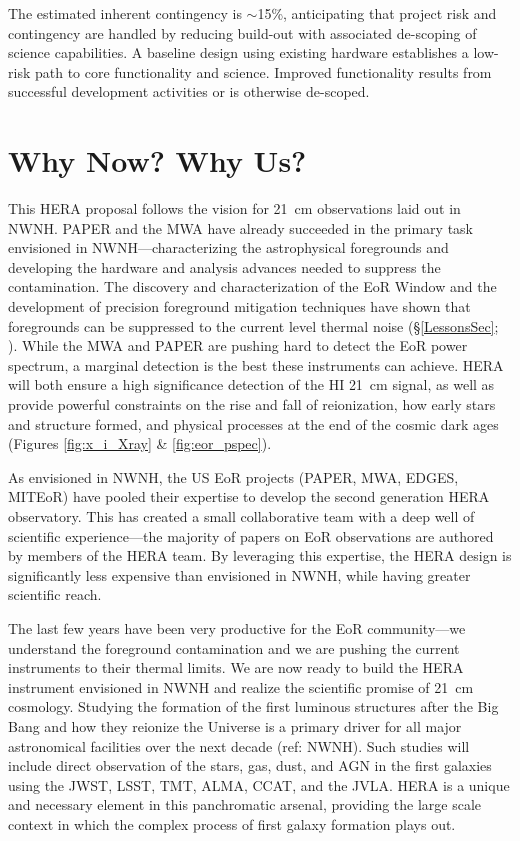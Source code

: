 \documentclass[preprint]{aastex}
\def\HI{{H{\small I }}}
\begin{document}
The estimated inherent contingency is $\sim$15\%, anticipating that project 
risk and contingency are handled by reducing
build-out with associated de-scoping of science capabilities.
A baseline design using
existing hardware establishes a low-risk path to core functionality and science.  Improved functionality
results from successful development activities or is otherwise de-scoped.


\section{Why Now? Why Us?} %

This HERA proposal follows the vision for 21~cm observations laid out in NWNH.
PAPER and the MWA have already succeeded in the primary task envisioned in
NWNH---characterizing the astrophysical foregrounds and developing the hardware
and analysis advances needed to suppress the contamination. The discovery and
characterization of the EoR Window and the development of precision foreground
mitigation techniques have shown that foregrounds can be suppressed to the current level
thermal noise (\S \ref{LessonsSec}; \citealt{parsons_et_al2013}). While the MWA
and PAPER are pushing hard to detect the EoR power spectrum, %
a marginal detection is the best these instruments can achieve.
HERA will both ensure a high significance detection of the \HI 21~cm signal, as
well as provide powerful constraints on the rise and fall of reionization, how
early stars and structure formed, and physical processes at the end of the
cosmic dark ages (Figures \ref{fig:x_i_Xray} \& \ref{fig:eor_pspec}).

As envisioned in NWNH, the US EoR projects (PAPER, MWA, EDGES, MITEoR) have
pooled their expertise to develop the second generation HERA observatory. This
has created a small collaborative team with a deep well of scientific
experience---the majority of papers on EoR observations are authored by members
of the HERA team. By leveraging this expertise, the HERA design is significantly
less expensive than envisioned in NWNH, while having greater scientific reach.

The last few years have been very productive for the EoR community---we
understand the foreground contamination and we are pushing the current
instruments to their thermal limits. We are now ready to build the HERA
instrument envisioned in NWNH and realize the scientific promise of 21~cm
cosmology.
Studying the formation of the first luminous structures after the Big
Bang and how they reionize the Universe is a primary driver for all %
major astronomical facilities over the next decade (ref: NWNH).
Such studies will include direct observation of the stars, gas, dust, and AGN in the
first galaxies using the JWST, LSST, TMT, ALMA, CCAT, and the JVLA. HERA is %
a unique and necessary element in this panchromatic arsenal, providing
the large scale context in which the complex process of first galaxy
formation plays out.

\clearpage
\setcounter{page}{1}
\thispagestyle{empty}
%
%

%

\end{document}
